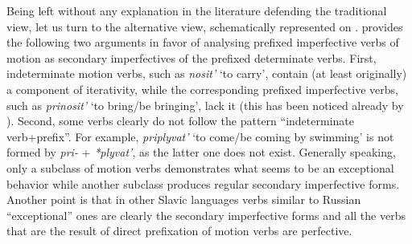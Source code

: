 
Being left without any explanation in the literature defending the traditional view, let us turn to the alternative view, schematically represented on . \citet{Regnell:44} provides the following two arguments in favor of analysing prefixed imperfective verbs of motion as secondary imperfectives of the prefixed determinate verbs. First, indeterminate motion verbs, such as \textit{nosit'}\textsubscript{\INDET} `to carry', contain (at least originally) a component of iterativity, while the corresponding prefixed imperfective verbs, such as \textit{prinosit'} `to bring/be bringing', lack it (this has been noticed already by \citealt{Mazon:1928}). Second, some verbs clearly do not follow the pattern ``indeterminate verb+prefix''. For example, \textit{priplyvat'} `to come/be coming by swimming' is not formed by \textit{pri-} + \textit{*plyvat'}, as the latter one does not exist. Generally speaking, only a subclass of motion verbs demonstrates what seems to be an exceptional behavior while another subclass produces regular secondary imperfective forms. Another point is that in other Slavic languages verbs similar to Russian ``exceptional'' ones are clearly the secondary imperfective forms and all the verbs that are the result of direct prefixation of motion verbs are perfective.

